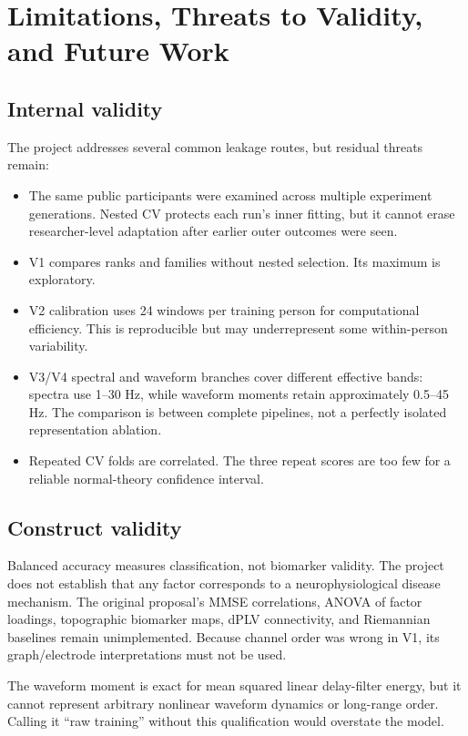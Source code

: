 \chapter{Limitations, Threats to Validity, and Future Work}
\label{ch:limitations}

\section{Internal validity}

The project addresses several common leakage routes, but residual threats remain:

\begin{itemize}
  \item The same public participants were examined across multiple experiment
  generations. Nested CV protects each run's inner fitting, but it cannot erase
  researcher-level adaptation after earlier outer outcomes were seen.
  \item V1 compares ranks and families without nested selection. Its maximum is
  exploratory.
  \item V2 calibration uses 24 windows per training person for computational
  efficiency. This is reproducible but may underrepresent some within-person
  variability.
  \item V3/V4 spectral and waveform branches cover different effective bands:
  spectra use 1--30 Hz, while waveform moments retain approximately 0.5--45 Hz.
  The comparison is between complete pipelines, not a perfectly isolated
  representation ablation.
  \item Repeated CV folds are correlated. The three repeat scores are too few for
  a reliable normal-theory confidence interval.
\end{itemize}

\section{Construct validity}

Balanced accuracy measures classification, not biomarker validity. The project
does not establish that any factor corresponds to a neurophysiological disease
mechanism. The original proposal's MMSE correlations, ANOVA of factor loadings,
topographic biomarker maps, dPLV connectivity, and Riemannian baselines remain
unimplemented. Because channel order was wrong in V1, its graph/electrode
interpretations must not be used.

The waveform moment is exact for mean squared linear delay-filter energy, but it
cannot represent arbitrary nonlinear waveform dynamics or long-range order.
Calling it ``raw training'' without this qualification would overstate the model.

